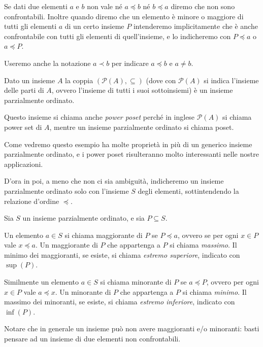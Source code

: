 \documentclass[12pt]{article}
\numberwithin{theorem}{subsection}
\begin{document}
Se dati due elementi $a$ e $b$ non vale né $a \preceq b$ né $b \preceq a$ diremo che non sono confrontabili.
Inoltre quando diremo che un elemento è minore o maggiore di tutti gli elementi $a$ di un certo insieme $P$ intenderemo implicitamente che è anche confrontabile con tutti gli elementi di quell'insieme, e lo indicheremo con $P \preceq a$ o $a \preceq P$.

Useremo anche la notazione $a \prec b$ per indicare $a \preceq b$ e $a \neq b$.

\begin{example}
	Dato un insieme $A$ la coppia $(\mathcal{P}(A), \subseteq)$ (dove con $\mathcal{P}(A)$ si indica l'insieme delle parti di $A$, ovvero l'insieme di tutti i suoi sottoinsiemi) è un insieme parzialmente ordinato.
	
	Questo insieme si chiama anche \textit{power poset} perché in inglese $\mathcal{P}(A)$ si chiama power set di $A$, mentre un insieme parzialmente ordinato si chiama poset.
	
	Come vedremo questo esempio ha molte proprietà in più di un generico insieme parzialmente ordinato, e i power poset risulteranno molto interessanti nelle nostre applicazioni.
\end{example}

D'ora in poi, a meno che non ci sia ambiguità, indicheremo un insieme parzialmente ordinato solo con l'insieme $S$ degli elementi, sottintendendo la relazione d'ordine $\preceq$.
\begin{definition}
	Sia $S$ un insieme parzialmente ordinato, e sia $P \subseteq S$.
	
	Un elemento $a \in S$ si chiama maggiorante di $P$ se $P \preceq a$, ovvero se per ogni $x \in P$ vale $x \preceq a$. Un maggiorante di $P$ che appartenga a $P$ si chiama \textit{massimo}. Il minimo dei maggioranti, se esiste, si chiama \textit{estremo superiore}, indicato con $\sup(P)$.
	
	Similmente un elemento $a \in S$ si chiama minorante di $P$ se $a \preceq P$, ovvero per ogni $x \in P$ vale $a \preceq x$. Un minorante di $P$ che appartenga a $P$ si chiama \textit{minimo}. Il massimo dei minoranti, se esiste, si chiama \textit{estremo inferiore}, indicato con $\inf(P)$.
\end{definition}

Notare che in generale un insieme può non avere maggioranti e/o minoranti: basti pensare ad un insieme di due elementi non confrontabili.
\end{document}

